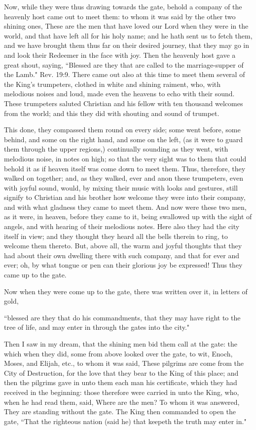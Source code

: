 Now, while they were thus drawing towards the gate, behold a company of the heavenly host came out to meet them: to whom it was said by the other two shining ones, These are the men that have loved our Lord when they were in the world, and that have left all for his holy name; and he hath sent us to fetch them, and we have brought them thus far on their desired journey, that they may go in and look their Redeemer in the face with joy. Then the heavenly host gave a great shout, saying, ``Blessed are they that are called to the marriage-supper of the Lamb." Rev. 19:9. There came out also at this time to meet them several of the King's trumpeters, clothed in white and shining raiment, who, with melodious noises and loud, made even the heavens to echo with their sound. These trumpeters saluted Christian and his fellow with ten thousand welcomes from the world; and this they did with shouting and sound of trumpet.

This done, they compassed them round on every side; some went before, some behind, and some on the right hand, and some on the left, (as it were to guard them through the upper regions,) continually sounding as they went, with melodious noise, in notes on high; so that the very sight was to them that could behold it as if heaven itself was come down to meet them. Thus, therefore, they walked on together; and, as they walked, ever and anon these trumpeters, even with joyful sound, would, by mixing their music with looks and gestures, still signify to Christian and his brother how welcome they were into their company, and with what gladness they came to meet them. And now were these two men, as it were, in heaven, before they came to it, being swallowed up with the sight of angels, and with hearing of their melodious notes. Here also they had the city itself in view; and they thought they heard all the bells therein to ring, to welcome them thereto. But, above all, the warm and joyful thoughts that they had about their own dwelling there with such company, and that for ever and ever; oh, by what tongue or pen can their glorious joy be expressed! Thus they came up to the gate.

Now when they were come up to the gate, there was written over it, in letters of gold,

``blessed are they that do his commandments, that they may have right to the tree of life, and may enter in through the gates into the city."

Then I saw in my dream, that the shining men bid them call at the gate: the which when they did, some from above looked over the gate, to wit, Enoch, Moses, and Elijah, etc., to whom it was said, These pilgrims are come from the City of Destruction, for the love that they bear to the King of this place; and then the pilgrims gave in unto them each man his certificate, which they had received in the beginning: those therefore were carried in unto the King, who, when he had read them, said, Where are the men? To whom it was answered, They are standing without the gate. The King then commanded to open the gate, ``That the righteous nation (said he) that keepeth the truth may enter in."

